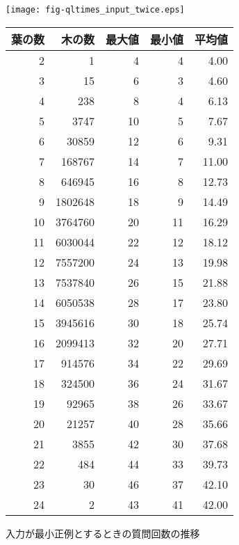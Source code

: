\begin{figure}[tb]
  \begin{center}
    \texttt{[image: fig-qltimes\_input\_twice.eps]}
    \caption{入力が最小正例とするときの質問回数の推移}\label{fig:qltimes_input_twice}
  \vspace*{10.5pt}
    \label{tbl:qltimes_input_twice}
    \begin{tabular}{rrrrr} \hline
      葉の数 &   木の数 & 最大値 & 最小値  & 平均値 \\ \hline\hline
          2 &       1 &     4 &     4  &  4.00 \\
          3 &      15 &     6 &     3  &  4.60 \\
          4 &     238 &     8 &     4  &  6.13 \\
          5 &    3747 &    10 &     5  &  7.67 \\
          6 &   30859 &    12 &     6  &  9.31 \\
          7 &  168767 &    14 &     7  & 11.00 \\
          8 &  646945 &    16 &     8  & 12.73 \\
          9 & 1802648 &    18 &     9  & 14.49 \\
         10 & 3764760 &    20 &     11 & 16.29 \\
         11 & 6030044 &    22 &     12 & 18.12 \\
         12 & 7557200 &    24 &     13 & 19.98 \\
         13 & 7537840 &    26 &     15 & 21.88 \\
         14 & 6050538 &    28 &     17 & 23.80 \\
         15 & 3945616 &    30 &     18 & 25.74 \\
         16 & 2099413 &    32 &     20 & 27.71 \\
         17 &  914576 &    34 &     22 & 29.69 \\
         18 &  324500 &    36 &     24 & 31.67 \\
         19 &   92965 &    38 &     26 & 33.67 \\
         20 &   21257 &    40 &     28 & 35.66 \\
         21 &    3855 &    42 &     30 & 37.68 \\
         22 &     484 &    44 &     33 & 39.73 \\
         23 &      30 &    46 &     37 & 42.10 \\
         24 &       2 &    43 &     41 & 42.00 \\ \hline
    \end{tabular}
\end{center}
\end{figure}
